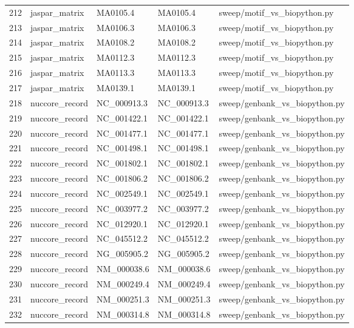 {\begin{longtable}{rllp{3.2cm}p{4.2cm}}
212 & jaspar\_matrix & MA0105.4 & MA0105.4 & sweep/motif\_vs\_biopython.py\\
213 & jaspar\_matrix & MA0106.3 & MA0106.3 & sweep/motif\_vs\_biopython.py\\
214 & jaspar\_matrix & MA0108.2 & MA0108.2 & sweep/motif\_vs\_biopython.py\\
215 & jaspar\_matrix & MA0112.3 & MA0112.3 & sweep/motif\_vs\_biopython.py\\
216 & jaspar\_matrix & MA0113.3 & MA0113.3 & sweep/motif\_vs\_biopython.py\\
217 & jaspar\_matrix & MA0139.1 & MA0139.1 & sweep/motif\_vs\_biopython.py\\
218 & nuccore\_record & NC\_000913.3 & NC\_000913.3 & sweep/genbank\_vs\_biopython.py\\
219 & nuccore\_record & NC\_001422.1 & NC\_001422.1 & sweep/genbank\_vs\_biopython.py\\
220 & nuccore\_record & NC\_001477.1 & NC\_001477.1 & sweep/genbank\_vs\_biopython.py\\
221 & nuccore\_record & NC\_001498.1 & NC\_001498.1 & sweep/genbank\_vs\_biopython.py\\
222 & nuccore\_record & NC\_001802.1 & NC\_001802.1 & sweep/genbank\_vs\_biopython.py\\
223 & nuccore\_record & NC\_001806.2 & NC\_001806.2 & sweep/genbank\_vs\_biopython.py\\
224 & nuccore\_record & NC\_002549.1 & NC\_002549.1 & sweep/genbank\_vs\_biopython.py\\
225 & nuccore\_record & NC\_003977.2 & NC\_003977.2 & sweep/genbank\_vs\_biopython.py\\
226 & nuccore\_record & NC\_012920.1 & NC\_012920.1 & sweep/genbank\_vs\_biopython.py\\
227 & nuccore\_record & NC\_045512.2 & NC\_045512.2 & sweep/genbank\_vs\_biopython.py\\
228 & nuccore\_record & NG\_005905.2 & NG\_005905.2 & sweep/genbank\_vs\_biopython.py\\
229 & nuccore\_record & NM\_000038.6 & NM\_000038.6 & sweep/genbank\_vs\_biopython.py\\
230 & nuccore\_record & NM\_000249.4 & NM\_000249.4 & sweep/genbank\_vs\_biopython.py\\
231 & nuccore\_record & NM\_000251.3 & NM\_000251.3 & sweep/genbank\_vs\_biopython.py\\
232 & nuccore\_record & NM\_000314.8 & NM\_000314.8 & sweep/genbank\_vs\_biopython.py\\

\end{longtable}}
